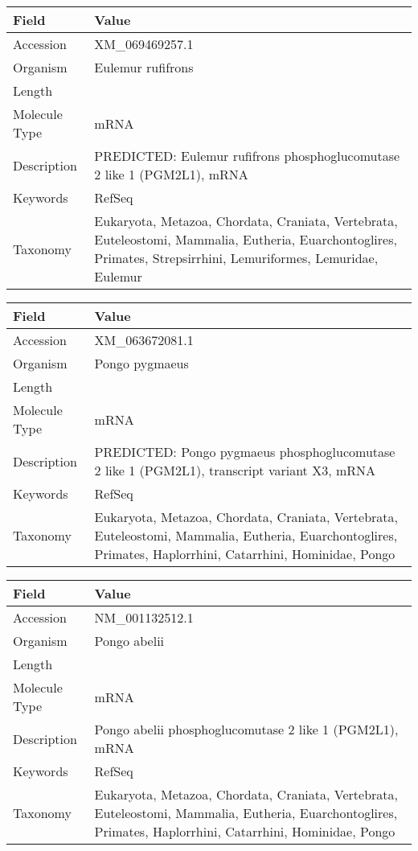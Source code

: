 \documentclass[10pt]{article}
\begin{document}
{\footnotesize
\begin{longtable}{>{\raggedright\arraybackslash}p{4.5cm} >{\raggedright\arraybackslash}p{11.5cm}}
\textbf{Field} & \textbf{Value} \\
\hline
Accession & XM\_069469257.1 \\
Organism & Eulemur rufifrons \\
Length & 1869 \\
Molecule Type & mRNA \\
Description & PREDICTED: Eulemur rufifrons phosphoglucomutase 2 like 1 (PGM2L1), mRNA \\
Keywords & RefSeq \\
Taxonomy & Eukaryota, Metazoa, Chordata, Craniata, Vertebrata, Euteleostomi, Mammalia, Eutheria, Euarchontoglires, Primates, Strepsirrhini, Lemuriformes, Lemuridae, Eulemur \\
\end{longtable}
}

{\footnotesize
\begin{longtable}{>{\raggedright\arraybackslash}p{4.5cm} >{\raggedright\arraybackslash}p{11.5cm}}
\textbf{Field} & \textbf{Value} \\
\hline
Accession & XM\_063672081.1 \\
Organism & Pongo pygmaeus \\
Length & 8280 \\
Molecule Type & mRNA \\
Description & PREDICTED: Pongo pygmaeus phosphoglucomutase 2 like 1 (PGM2L1), transcript variant X3, mRNA \\
Keywords & RefSeq \\
Taxonomy & Eukaryota, Metazoa, Chordata, Craniata, Vertebrata, Euteleostomi, Mammalia, Eutheria, Euarchontoglires, Primates, Haplorrhini, Catarrhini, Hominidae, Pongo \\
\end{longtable}
}

{\footnotesize
\begin{longtable}{>{\raggedright\arraybackslash}p{4.5cm} >{\raggedright\arraybackslash}p{11.5cm}}
\textbf{Field} & \textbf{Value} \\
\hline
Accession & NM\_001132512.1 \\
Organism & Pongo abelii \\
Length & 3912 \\
Molecule Type & mRNA \\
Description & Pongo abelii phosphoglucomutase 2 like 1 (PGM2L1), mRNA \\
Keywords & RefSeq \\
Taxonomy & Eukaryota, Metazoa, Chordata, Craniata, Vertebrata, Euteleostomi, Mammalia, Eutheria, Euarchontoglires, Primates, Haplorrhini, Catarrhini, Hominidae, Pongo \\
\end{longtable}
}
\end{document}
